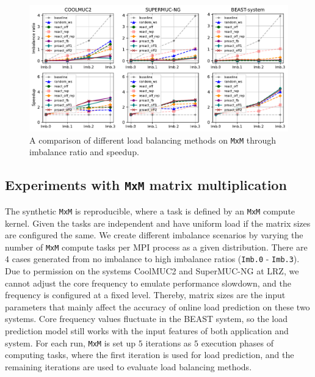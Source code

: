 \begin{figure}[t]
  \centering
  \includegraphics[scale=0.675]{./pictures/evaluation/eval_artificial_benchmark_mxm.pdf}
	\caption{A comparison of different load balancing methods on \texttt{MxM} through imbalance ratio and speedup.}
	\label{fig:eval_mxm_benchmarks}
\end{figure}

\subsection{Experiments with \texttt{MxM} matrix multiplication}
\label{subsec:exp_eval_lb_mxm}

The synthetic \texttt{MxM} is reproducible, where a task is defined by an \texttt{MxM} compute kernel. Given the tasks are independent and have uniform load if the matrix sizes are configured the same. We create different imbalance scenarios by varying the number of \texttt{MxM} compute tasks per MPI process as a given distribution. There are $4$ cases generated from no imbalance to high imbalance ratios (\texttt{Imb.0} - \texttt{Imb.3}). Due to permission on the systems CoolMUC2 and SuperMUC-NG at LRZ, we cannot adjust the core frequency to emulate performance slowdown, and the frequency is configured at a fixed level. Thereby, matrix sizes are the input parameters that mainly affect the accuracy of online load prediction on these two systems. Core frequency values fluctuate in the BEAST system, so the load prediction model still works with the input features of both application and system. For each run, \texttt{MxM} is set up $5$ iterations as $5$ execution phases of computing tasks, where the first iteration is used for load prediction, and the remaining iterations are used to evaluate load balancing methods.\\

